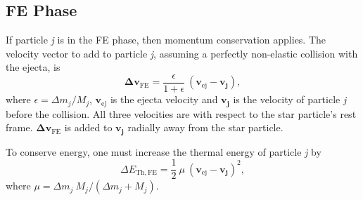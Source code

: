 \documentclass[iop]{emulateapj}
\begin{document}
\subsection{FE Phase}
If particle \textit{j} is in the FE phase, then momentum conservation applies. The velocity vector to add to particle \textit{j}, assuming a perfectly non-elastic collision with the ejecta, is
\begin{equation}\label{FE_vadd}
\boldsymbol{\Delta v_{\mathrm{FE}}} = \frac{\epsilon}{1+\epsilon}\ (\boldsymbol{v_{\mathrm{ej}}} -\boldsymbol{v_j}),
\end{equation}
where $\epsilon=\Delta m_j/M_j$, $\boldsymbol{v_{\mathrm{ej}}}$ is the ejecta velocity and $\boldsymbol{v_j}$ is the velocity of particle \textit{j} before the collision. All three velocities are with respect to the star particle's rest frame. $\boldsymbol{\Delta v_{\mathrm{FE}}}$ is added to $\boldsymbol{v_j}$ radially away from the star particle.

To conserve energy, one must increase the thermal energy of particle \textit{j} by
\begin{equation}\label{FE_Ethadd}
\Delta E_{\mathrm{Th,FE}} = \frac{1}{2}\ \mu \ (\boldsymbol{v_{\mathrm{ej}}} -\boldsymbol{v_j})^2,
\end{equation}
where $\mu=\Delta m_j\ M_j/(\Delta m_j+M_j)$.
\end{document}
